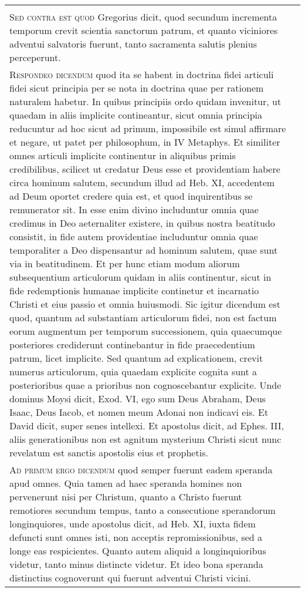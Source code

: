 \documentclass[10pt]{jsarticle} %
\begin{document}
\begin{longtable}{p{21em}p{21em}}
&


\\


{\scshape  Sed contra est quod} Gregorius dicit,
quod secundum incrementa temporum crevit scientia sanctorum patrum, et
quanto viciniores adventui salvatoris fuerunt, tanto sacramenta salutis
plenius perceperunt.

&


\\


{\scshape Respondeo dicendum} quod ita se habent in
doctrina fidei articuli fidei sicut principia per se nota in doctrina
quae per rationem naturalem habetur. In quibus principiis ordo quidam
invenitur, ut quaedam in aliis implicite contineantur, sicut omnia
principia reducuntur ad hoc sicut ad primum, impossibile est simul
affirmare et negare, ut patet per philosophum, in IV Metaphys. Et
similiter omnes articuli implicite continentur in aliquibus primis
credibilibus, scilicet ut credatur Deus esse et providentiam habere
circa hominum salutem, secundum illud ad Heb. XI, accedentem ad Deum
oportet credere quia est, et quod inquirentibus se remunerator sit. In
esse enim divino includuntur omnia quae credimus in Deo aeternaliter
existere, in quibus nostra beatitudo consistit, in fide autem
providentiae includuntur omnia quae temporaliter a Deo dispensantur ad
hominum salutem, quae sunt via in beatitudinem. Et per hunc etiam modum
aliorum subsequentium articulorum quidam in aliis continentur, sicut in
fide redemptionis humanae implicite continetur et incarnatio Christi et
eius passio et omnia huiusmodi. Sic igitur dicendum est quod, quantum ad
substantiam articulorum fidei, non est factum eorum augmentum per
temporum successionem, quia quaecumque posteriores crediderunt
continebantur in fide praecedentium patrum, licet implicite. Sed quantum
ad explicationem, crevit numerus articulorum, quia quaedam explicite
cognita sunt a posterioribus quae a prioribus non cognoscebantur
explicite. Unde dominus Moysi dicit, Exod. VI, ego sum Deus Abraham,
Deus Isaac, Deus Iacob, et nomen meum Adonai non indicavi eis. Et David
dicit, super senes intellexi. Et apostolus dicit, ad Ephes. III, aliis
generationibus non est agnitum mysterium Christi sicut nunc revelatum
est sanctis apostolis eius et prophetis.

&


\\



{\scshape Ad primum ergo dicendum} quod semper
fuerunt eadem speranda apud omnes. Quia tamen ad haec speranda homines
non pervenerunt nisi per Christum, quanto a Christo fuerunt remotiores
secundum tempus, tanto a consecutione sperandorum longinquiores, unde
apostolus dicit, ad Heb. XI, iuxta fidem defuncti sunt omnes isti, non
acceptis repromissionibus, sed a longe eas respicientes. Quanto autem
aliquid a longinquioribus videtur, tanto minus distincte videtur. Et
ideo bona speranda distinctius cognoverunt qui fuerunt adventui Christi
vicini.
&



\end{longtable}
\end{document}

